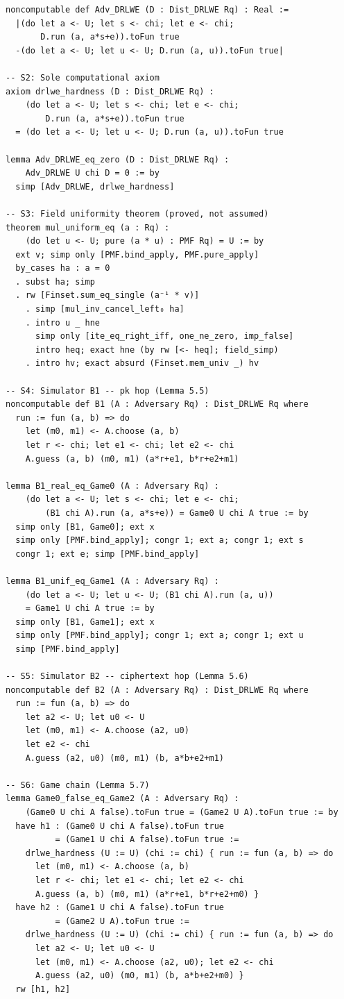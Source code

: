 \documentclass[11pt,a4paper]{article}
\theoremstyle{remark}
\begin{document}
\begin{lstlisting}[language={}]
noncomputable def Adv_DRLWE (D : Dist_DRLWE Rq) : Real :=
  |(do let a <- U; let s <- chi; let e <- chi;
       D.run (a, a*s+e)).toFun true
  -(do let a <- U; let u <- U; D.run (a, u)).toFun true|

-- S2: Sole computational axiom
axiom drlwe_hardness (D : Dist_DRLWE Rq) :
    (do let a <- U; let s <- chi; let e <- chi;
        D.run (a, a*s+e)).toFun true
  = (do let a <- U; let u <- U; D.run (a, u)).toFun true

lemma Adv_DRLWE_eq_zero (D : Dist_DRLWE Rq) :
    Adv_DRLWE U chi D = 0 := by
  simp [Adv_DRLWE, drlwe_hardness]

-- S3: Field uniformity theorem (proved, not assumed)
theorem mul_uniform_eq (a : Rq) :
    (do let u <- U; pure (a * u) : PMF Rq) = U := by
  ext v; simp only [PMF.bind_apply, PMF.pure_apply]
  by_cases ha : a = 0
  . subst ha; simp
  . rw [Finset.sum_eq_single (a⁻¹ * v)]
    . simp [mul_inv_cancel_left₀ ha]
    . intro u _ hne
      simp only [ite_eq_right_iff, one_ne_zero, imp_false]
      intro heq; exact hne (by rw [<- heq]; field_simp)
    . intro hv; exact absurd (Finset.mem_univ _) hv

-- S4: Simulator B1 -- pk hop (Lemma 5.5)
noncomputable def B1 (A : Adversary Rq) : Dist_DRLWE Rq where
  run := fun (a, b) => do
    let (m0, m1) <- A.choose (a, b)
    let r <- chi; let e1 <- chi; let e2 <- chi
    A.guess (a, b) (m0, m1) (a*r+e1, b*r+e2+m1)

lemma B1_real_eq_Game0 (A : Adversary Rq) :
    (do let a <- U; let s <- chi; let e <- chi;
        (B1 chi A).run (a, a*s+e)) = Game0 U chi A true := by
  simp only [B1, Game0]; ext x
  simp only [PMF.bind_apply]; congr 1; ext a; congr 1; ext s
  congr 1; ext e; simp [PMF.bind_apply]

lemma B1_unif_eq_Game1 (A : Adversary Rq) :
    (do let a <- U; let u <- U; (B1 chi A).run (a, u))
    = Game1 U chi A true := by
  simp only [B1, Game1]; ext x
  simp only [PMF.bind_apply]; congr 1; ext a; congr 1; ext u
  simp [PMF.bind_apply]

-- S5: Simulator B2 -- ciphertext hop (Lemma 5.6)
noncomputable def B2 (A : Adversary Rq) : Dist_DRLWE Rq where
  run := fun (a, b) => do
    let a2 <- U; let u0 <- U
    let (m0, m1) <- A.choose (a2, u0)
    let e2 <- chi
    A.guess (a2, u0) (m0, m1) (b, a*b+e2+m1)

-- S6: Game chain (Lemma 5.7)
lemma Game0_false_eq_Game2 (A : Adversary Rq) :
    (Game0 U chi A false).toFun true = (Game2 U A).toFun true := by
  have h1 : (Game0 U chi A false).toFun true
          = (Game1 U chi A false).toFun true :=
    drlwe_hardness (U := U) (chi := chi) { run := fun (a, b) => do
      let (m0, m1) <- A.choose (a, b)
      let r <- chi; let e1 <- chi; let e2 <- chi
      A.guess (a, b) (m0, m1) (a*r+e1, b*r+e2+m0) }
  have h2 : (Game1 U chi A false).toFun true
          = (Game2 U A).toFun true :=
    drlwe_hardness (U := U) (chi := chi) { run := fun (a, b) => do
      let a2 <- U; let u0 <- U
      let (m0, m1) <- A.choose (a2, u0); let e2 <- chi
      A.guess (a2, u0) (m0, m1) (b, a*b+e2+m0) }
  rw [h1, h2]


\end{lstlisting}
\end{document}
